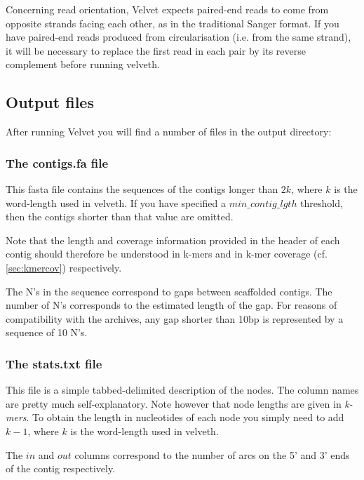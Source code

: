 \documentclass{article}
\begin{document}
Concerning read orientation, Velvet expects paired-end reads to come from opposite strands facing each other, as in the traditional Sanger format. If you have paired-end reads produced from circularisation (i.e. from the same strand), it will be necessary to replace the first read in each pair by its reverse complement before running velveth.

\subsection{Output files} 

\label{sec:output}

After running Velvet you will find a number of files in the output directory:

\subsubsection{The contigs.fa file}

\label{sec:fasta}

This fasta file contains the sequences of the contigs longer than $2k$, where $k$ is the word-length used in velveth. If you have specified a $min\_contig\_lgth$ threshold, then the contigs shorter than that value are omitted.

Note that the length and coverage information provided in the header of each contig should therefore be understood in k-mers and in k-mer coverage (cf. \ref{sec:kmercov}) respectively.

The N's in the sequence correspond to gaps between scaffolded contigs. The number of N's corresponds to the estimated length of the gap. For reasons of compatibility with the archives, any gap shorter than 10bp is represented by a sequence of 10 N's.

\subsubsection{The stats.txt file}

\label{sec:stats}

This file is a simple tabbed-delimited description of the nodes. The column names are pretty much self-explanatory. Note however that node lengths are given in \emph{k-mers}. To obtain the length in nucleotides of each node you simply need to add $k-1$, where $k$ is the word-length used in velveth.

The $in$ and $out$ columns correspond to the number of arcs on the 5' and 3' ends of the contig respectively.
\end{document}
